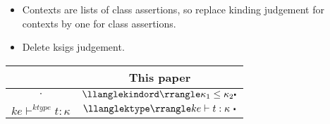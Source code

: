 \begin{itemize}
    \item Contexts are lists of class assertions, so replace kinding judgement for contexts by one for class assertions.
    \item Delete ksigs judgement.
\end{itemize}

\begin{center}
  \begin{tabular}{cc}
    \toprule
    \citet{Faxen2002staticsemantics} & This paper \\
    \midrule
    $\cdot$ & $\jkindord{\kappa_1}{\kappa_2}$ \\
    $ke \vdash^{ktype} t : \kappa$ & $\jktype{ke}{t}{\kappa}$ \\
    \bottomrule
  \end{tabular}
\end{center}
